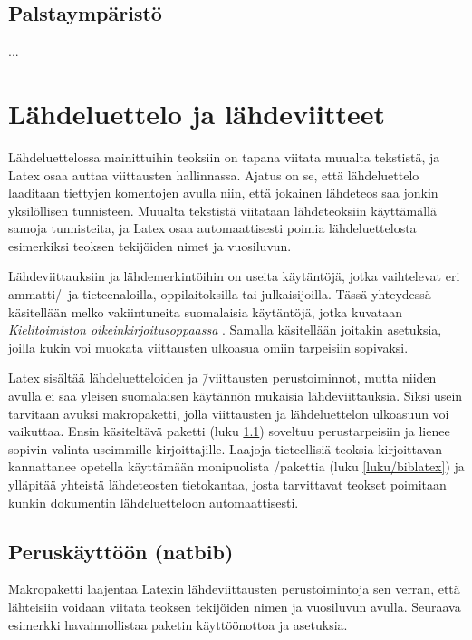 \subsection{Palstaympäristö}
\label{luku/multicol}

...

\section{Lähdeluettelo ja lähdeviitteet}
\label{luku/lähteet}

Lähdeluettelossa mainittuihin teoksiin on tapana viitata muualta
tekstistä, ja Latex osaa auttaa viittausten hallinnassa. Ajatus on se,
että lähdeluettelo laaditaan tiettyjen komentojen avulla niin, että
jokainen lähdeteos saa jonkin yksilöllisen tunnisteen. Muualta tekstistä
viitataan lähdeteoksiin käyttämällä samoja tunnisteita, ja Latex osaa
automaattisesti poimia lähdeluettelosta esimerkiksi teoksen tekijöiden
nimet ja vuosiluvun.

Lähdeviittauksiin ja lähdemerkintöihin on useita käytäntöjä, jotka
vaihtelevat eri ammatti\-/\ ja tieteenaloilla, oppilaitoksilla tai
julkaisijoilla. Tässä yhteydessä käsitellään melko vakiintuneita
suomalaisia käytäntöjä, jotka kuvataan \emph{Kielitoimiston
  oikeinkirjoitusoppaassa} \parencite{kt_oik}. Samalla käsitellään
joitakin asetuksia, joilla kukin voi muokata viittausten ulkoasua omiin
tarpeisiin sopivaksi.

Latex sisältää lähdeluetteloiden ja \=/viittausten perustoiminnot, mutta
niiden avulla ei saa yleisen suomalaisen käytännön mukaisia
lähdeviittauksia. Siksi usein tarvitaan avuksi makropaketti, jolla
viittausten ja lähdeluettelon ulkoasuun voi vaikuttaa. Ensin käsiteltävä
paketti  (luku \ref{luku/natbib}) soveltuu
perustarpeisiin ja lienee sopivin valinta useimmille kirjoittajille.
Laajoja tieteellisiä teoksia kirjoittavan kannattanee opetella
käyttämään monipuolista \-/pakettia (luku
\ref{luku/biblatex}) ja ylläpitää yhteistä lähdeteosten tietokantaa,
josta tarvittavat teokset poimitaan kunkin dokumentin lähdeluetteloon
automaattisesti.

\subsection{Peruskäyttöön (natbib)}
\label{luku/natbib}

Makropaketti  laajentaa Latexin
lähdeviittausten perustoimintoja sen verran, että lähteisiin voidaan
viitata teoksen tekijöiden nimen ja vuosiluvun avulla. Seuraava
esimerkki havainnollistaa paketin käyttöönottoa ja asetuksia.

